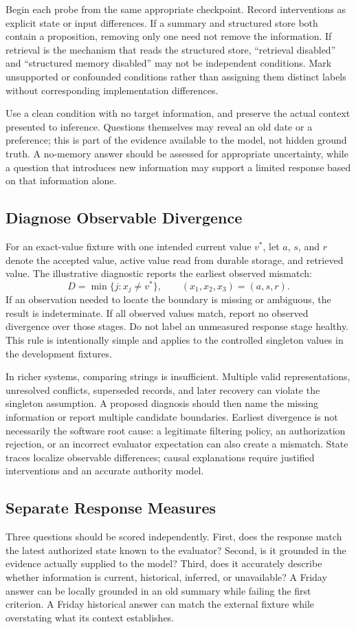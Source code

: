 \documentclass[runningheads]{llncs}
\begin{document}
Begin each probe from the same appropriate checkpoint. Record interventions as explicit state or input differences. If a summary and structured store both contain a proposition, removing only one need not remove the information. If retrieval is the mechanism that reads the structured store, ``retrieval disabled'' and ``structured memory disabled'' may not be independent conditions. Mark unsupported or confounded conditions rather than assigning them distinct labels without corresponding implementation differences.

Use a clean condition with no target information, and preserve the actual context presented to inference. Questions themselves may reveal an old date or a preference; this is part of the evidence available to the model, not hidden ground truth. A no-memory answer should be assessed for appropriate uncertainty, while a question that introduces new information may support a limited response based on that information alone.

\subsection{Diagnose Observable Divergence}
For an exact-value fixture with one intended current value $v^*$, let $a$, $s$, and $r$ denote the accepted value, active value read from durable storage, and retrieved value. The illustrative diagnostic reports the earliest observed mismatch:
\[
D = \min\{j : x_j \ne v^*\}, \qquad (x_1,x_2,x_3)=(a,s,r).
\]
If an observation needed to locate the boundary is missing or ambiguous, the result is indeterminate. If all observed values match, report no observed divergence over those stages. Do not label an unmeasured response stage healthy. This rule is intentionally simple and applies to the controlled singleton values in the development fixtures.

In richer systems, comparing strings is insufficient. Multiple valid representations, unresolved conflicts, superseded records, and later recovery can violate the singleton assumption. A proposed diagnosis should then name the missing information or report multiple candidate boundaries. Earliest divergence is not necessarily the software root cause: a legitimate filtering policy, an authorization rejection, or an incorrect evaluator expectation can also create a mismatch. State traces localize observable differences; causal explanations require justified interventions and an accurate authority model.

\subsection{Separate Response Measures}
Three questions should be scored independently. First, does the response match the latest authorized state known to the evaluator? Second, is it grounded in the evidence actually supplied to the model? Third, does it accurately describe whether information is current, historical, inferred, or unavailable? A Friday answer can be locally grounded in an old summary while failing the first criterion. A Friday historical answer can match the external fixture while overstating what its context establishes.
\end{document}
